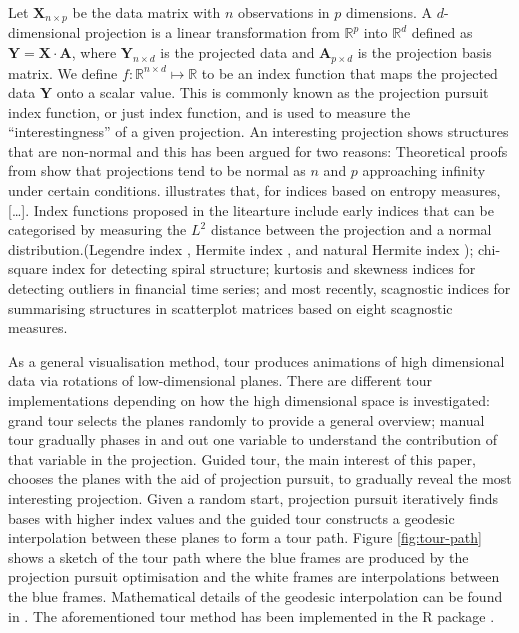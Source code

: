 Let \(\mathbf{X}_{n \times p}\) be the data matrix with \(n\)
observations in \(p\) dimensions. A \(d\)-dimensional projection is a
linear transformation from \(\mathbb{R}^p\) into \(\mathbb{R}^d\)
defined as \(\mathbf{Y} = \mathbf{X} \cdot \mathbf{A}\), where
\(\mathbf{Y}_{n \times d}\) is the projected data and
\(\mathbf{A}_{p\times d}\) is the projection basis matrix. We define
\(f: \mathbb{R}^{n \times d} \mapsto \mathbb{R}\) to be an index
function that maps the projected data \(\mathbf{Y}\) onto a scalar
value. This is commonly known as the projection pursuit index function,
or just index function, and is used to measure the ``interestingness''
of a given projection. An interesting projection shows structures that
are non-normal and this has been argued for two reasons: Theoretical
proofs from \citet{diaconis1984asymptotics} show that projections tend
to be normal as \(n\) and \(p\) approaching infinity under certain
conditions. \citet{huber1985projection} illustrates that, for indices
based on entropy measures, {[}\ldots{}{]}. Index functions proposed in
the litearture include early indices that can be categorised by
measuring the \(L^2\) distance between the projection and a normal
distribution.(Legendre index \citep{friedman1974projection}, Hermite
index \citep{hall1989polynomial}, and natural Hermite index
\citep{cook1993projection}); chi-square index
\citep{posse1995projection} for detecting spiral structure; kurtosis
\citep{Loperfido2020} and skewness \citep{Loperfido2018} indices for
detecting outliers in financial time series; and most recently,
scagnostic indices \citep{laa2020using} for summarising structures in
scatterplot matrices based on eight scagnostic measures.

As a general visualisation method, tour produces animations of high
dimensional data via rotations of low-dimensional planes. There are
different tour implementations depending on how the high dimensional
space is investigated: grand tour \citep{cook2008grand} selects the
planes randomly to provide a general overview; manual tour
\citep{cook1997manual} gradually phases in and out one variable to
understand the contribution of that variable in the projection. Guided
tour, the main interest of this paper, chooses the planes with the aid
of projection pursuit, to gradually reveal the most interesting
projection. Given a random start, projection pursuit iteratively finds
bases with higher index values and the guided tour constructs a geodesic
interpolation between these planes to form a tour path. Figure
\ref{fig:tour-path} shows a sketch of the tour path where the blue
frames are produced by the projection pursuit optimisation and the white
frames are interpolations between the blue frames. Mathematical details
of the geodesic interpolation can be found in
\citet{buja2005computational}. The aforementioned tour method has been
implemented in the R package  \citep{tourr}.

